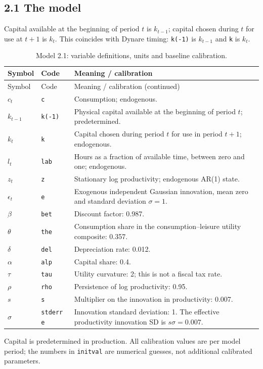 \documentclass[12pt]{article}
\begin{document}
\subsection*{2.1 The model}

Capital available at the beginning of period $t$ is $k_{t-1}$; capital chosen during $t$ for use at $t+1$ is $k_t$. This coincides with Dynare timing: \texttt{k(-1)} is $k_{t-1}$ and \texttt{k} is $k_t$.

\begingroup
\small
\captionsetup{labelformat=empty}
\begin{longtable}{p{}p{}p{}}
\caption{Model 2.1: variable definitions, units and baseline calibration.}\\
\hline
Symbol & Code & Meaning / calibration \\
\hline
\endfirsthead
Symbol & Code & Meaning / calibration (continued) \\
\hline
\endhead
$c_t$ & \texttt{c} & Consumption; endogenous. \\
$k_{t-1}$ & \texttt{k(-1)} & Physical capital available at the beginning of period $t$; predetermined. \\
$k_t$ & \texttt{k} & Capital chosen during period $t$ for use in period $t+1$; endogenous. \\
$l_t$ & \texttt{lab} & Hours as a fraction of available time, between zero and one; endogenous. \\
$z_t$ & \texttt{z} & Stationary log productivity; endogenous AR(1) state. \\
$\epsilon_t$ & \texttt{e} & Exogenous independent Gaussian innovation, mean zero and standard deviation $\sigma=1$. \\
$\beta$ & \texttt{bet} & Discount factor: 0.987. \\
$\theta$ & \texttt{the} & Consumption share in the consumption--leisure utility composite: 0.357. \\
$\delta$ & \texttt{del} & Depreciation rate: 0.012. \\
$\alpha$ & \texttt{alp} & Capital share: 0.4. \\
$\tau$ & \texttt{tau} & Utility curvature: 2; this is not a fiscal tax rate. \\
$\rho$ & \texttt{rho} & Persistence of log productivity: 0.95. \\
$s$ & \texttt{s} & Multiplier on the innovation in productivity: 0.007. \\
$\sigma$ & \texttt{stderr e} & Innovation standard deviation: 1. The effective productivity innovation SD is $s\sigma=0.007$. \\
\hline
\end{longtable}
\noindent Capital is predetermined in production. All calibration values are per model period; the numbers in \texttt{initval} are numerical guesses, not additional calibrated parameters.
\endgroup
\end{document}
